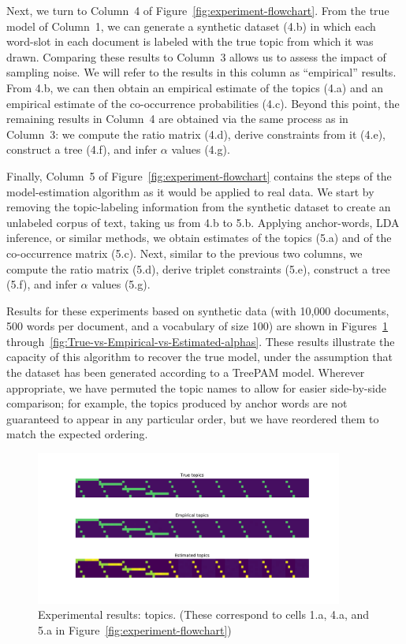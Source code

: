 \documentclass{article}
\theoremstyle{definition}
\begin{document}
Next, we turn to Column~4 of Figure~\ref{fig:experiment-flowchart}.
From the true model of Column~1, we can generate a synthetic dataset (4.b) in which each word-slot in each document is labeled with the true topic from which it was drawn.
Comparing these results to Column~3 allows us to assess the impact of sampling noise.
We will refer to the results in this column as ``empirical'' results.
From 4.b, we can then obtain an empirical estimate of the topics (4.a) and an empirical estimate of the co-occurrence probabilities (4.c).
Beyond this point, the remaining results in Column~4 are obtained via the same process as in Column~3: we compute the ratio matrix (4.d), derive constraints from it (4.e), construct a tree (4.f), and infer $\alpha$ values (4.g).

Finally, Column~5 of Figure~\ref{fig:experiment-flowchart} contains the steps of the model-estimation algorithm as it would be applied to real data.
We start by removing the topic-labeling information from the synthetic dataset to create an unlabeled corpus of text, taking us from 4.b to 5.b.
Applying anchor-words, LDA inference, or similar methods, we obtain estimates of the topics (5.a) and of the co-occurrence matrix (5.c).
Next, similar to the previous two columns, we compute the ratio matrix (5.d), derive triplet constraints (5.e), construct a tree (5.f), and infer $\alpha$ values (5.g).

Results for these experiments based on synthetic data (with 10,000 documents, 500 words per document, and a vocabulary of size 100) are shown in Figures~\ref{fig:True-vs-Empirical-vs-Estimated-topics} through~\ref{fig:True-vs-Empirical-vs-Estimated-alphas}.
These results illustrate the capacity of this algorithm to recover the true model, under the assumption that the dataset has been generated according to a TreePAM model.
Wherever appropriate, we have permuted the topic names to allow for easier side-by-side comparison; for example, the topics produced by anchor words are not guaranteed to appear in any particular order, but we have reordered them to match the expected ordering.

\begin{figure}[hpbt]
    \centering
    \includegraphics[width=0.9\textwidth]{figures/True-vs-Empirical-vs-Estimated-topics.pdf}
    \caption{Experimental results: topics.  (These correspond to cells 1.a, 4.a, and 5.a in Figure~\ref{fig:experiment-flowchart})}
    \label{fig:True-vs-Empirical-vs-Estimated-topics}
\end{figure}
\end{document}
